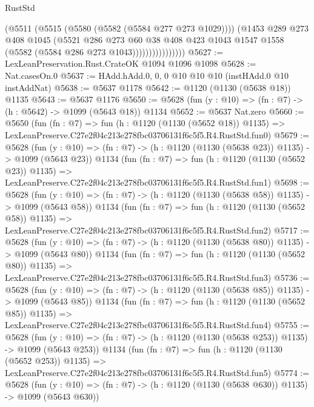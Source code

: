 \begin{lexlean}{RustStd}
\begin{coremodule}
                          (@5511
                            (@5515 (@5580 (@5582 (@5584 @277 @273 @1029))))
                            (@1453
                              @289
                              @273
                              @408
                              @1045
                              (@5521
                                @286
                                @273
                                @60
                                @38
                                @408
                                @423
                                @1043
                                @1547
                                @1558
                                (@5582 (@5584 @286 @273 @1043))))))))))))))))
@5627 := LexLeanPreservation.Rust.CrateOK @1094 @1096 @1098
@5628 := Nat.casesOn.{0}
@5637 := HAdd.hAdd.{0, 0, 0} @10 @10 @10 (instHAdd.{0} @10 instAddNat)
@5638 := @5637 @1178
@5642 := @1120 (@1130 (@5638 @18)) @1135
@5643 := @5637 @1176
@5650 := @5628 (fun (y : @10) => (fn : @7) -> (h : @5642) -> @1099 (@5643 @18)) @1134
@5652 := @5637 Nat.zero
@5660 := @5650
    (fun (fn : @7) =>
    fun (h : @1120 (@1130 (@5652 @18)) @1135) =>
    LexLeanPreserve.C27e2f04c213e278fbc03706131f6c5f5.R4.RustStd.fun0)
@5679 := @5628
    (fun (y : @10) => (fn : @7) -> (h : @1120 (@1130 (@5638 @23)) @1135) -> @1099 (@5643 @23))
    @1134
    (fun (fn : @7) =>
    fun (h : @1120 (@1130 (@5652 @23)) @1135) =>
    LexLeanPreserve.C27e2f04c213e278fbc03706131f6c5f5.R4.RustStd.fun1)
@5698 := @5628
    (fun (y : @10) => (fn : @7) -> (h : @1120 (@1130 (@5638 @58)) @1135) -> @1099 (@5643 @58))
    @1134
    (fun (fn : @7) =>
    fun (h : @1120 (@1130 (@5652 @58)) @1135) =>
    LexLeanPreserve.C27e2f04c213e278fbc03706131f6c5f5.R4.RustStd.fun2)
@5717 := @5628
    (fun (y : @10) => (fn : @7) -> (h : @1120 (@1130 (@5638 @80)) @1135) -> @1099 (@5643 @80))
    @1134
    (fun (fn : @7) =>
    fun (h : @1120 (@1130 (@5652 @80)) @1135) =>
    LexLeanPreserve.C27e2f04c213e278fbc03706131f6c5f5.R4.RustStd.fun3)
@5736 := @5628
    (fun (y : @10) => (fn : @7) -> (h : @1120 (@1130 (@5638 @85)) @1135) -> @1099 (@5643 @85))
    @1134
    (fun (fn : @7) =>
    fun (h : @1120 (@1130 (@5652 @85)) @1135) =>
    LexLeanPreserve.C27e2f04c213e278fbc03706131f6c5f5.R4.RustStd.fun4)
@5755 := @5628
    (fun (y : @10) => (fn : @7) -> (h : @1120 (@1130 (@5638 @253)) @1135) -> @1099 (@5643 @253))
    @1134
    (fun (fn : @7) =>
    fun (h : @1120 (@1130 (@5652 @253)) @1135) =>
    LexLeanPreserve.C27e2f04c213e278fbc03706131f6c5f5.R4.RustStd.fun5)
@5774 := @5628
    (fun (y : @10) => (fn : @7) -> (h : @1120 (@1130 (@5638 @630)) @1135) -> @1099 (@5643 @630))

\end{coremodule}
\end{lexlean}
